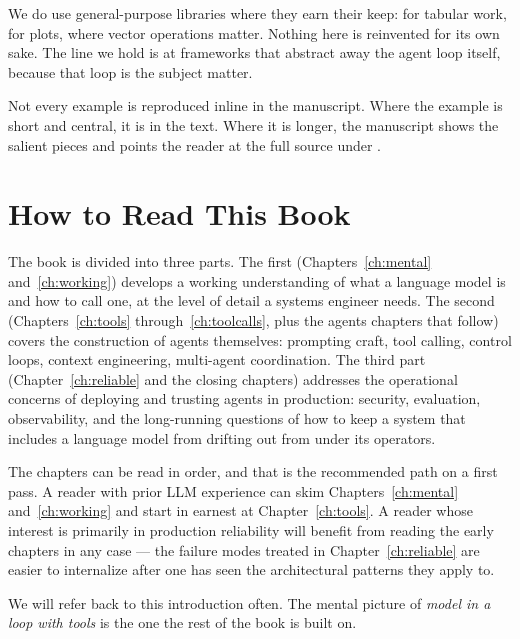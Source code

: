 We do use general-purpose libraries where they earn their keep:
 for tabular work,  for plots,
 where vector operations matter. Nothing here is
reinvented for its own sake. The line we hold is at frameworks
that abstract away the agent loop itself, because that loop is
the subject matter.

Not every example is reproduced inline in the manuscript. Where
the example is short and central, it is in the text. Where it is
longer, the manuscript shows the salient pieces and points the
reader at the full source under .

\section{How to Read This Book}
\label{sec:intro-roadmap}

The book is divided into three parts. The first
(Chapters~\ref{ch:mental} and~\ref{ch:working})
develops a working understanding of what a language model is and
how to call one, at the level of detail a systems engineer needs.
The second (Chapters~\ref{ch:tools} through~\ref{ch:toolcalls},
plus the agents chapters that follow) covers the construction of
agents themselves: prompting craft, tool calling, control loops,
context engineering, multi-agent coordination. The third part
(Chapter~\ref{ch:reliable} and the closing chapters)
addresses the operational concerns of deploying and trusting
agents in production: security, evaluation, observability,
and the long-running questions of how to keep a system that
includes a language model from drifting out from under its
operators.

The chapters can be read in order, and that is the recommended
path on a first pass. A reader with prior LLM experience can skim
Chapters~\ref{ch:mental} and~\ref{ch:working} and start in earnest
at Chapter~\ref{ch:tools}. A reader whose interest is primarily in
production reliability will benefit from reading the early
chapters in any case --- the failure modes treated in
Chapter~\ref{ch:reliable} are easier to internalize after one has
seen the architectural patterns they apply to.

We will refer back to this introduction often. The mental picture
of \emph{model in a loop with tools} is the one the rest of the
book is built on.
